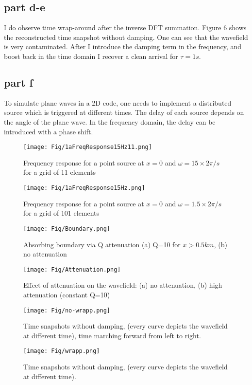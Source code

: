 \documentclass[10pt]{article}
\begin{document}
\subsection{part d-e}
I do observe time wrap-around after the inverse DFT summation. Figure 6 shows the reconstructed time snapshot without damping. One can see that the wavefield is very contaminated. After I introduce the damping term in the frequency, and boost back in the time domain I recover a clean arrival for $\tau=1s$.


\subsection{part f}
To simulate plane waves in a 2D code, one needs to implement a distributed source which is triggered at different times. The delay of each source depends on the angle of the plane wave. In the frequency domain, the delay can be introduced with a phase shift. 

 
\begin{figure}
  \center
  \texttt{[image: Fig/1aFreqResponse15Hz11.png]}
  \caption{Frequency response for a point source at $x=0$ and $\omega=15\times2\pi/s$ for a grid of 11 elements}
\end{figure}

\begin{figure}
  \center
  \texttt{[image: Fig/1aFreqResponse15Hz.png]}
  \caption{Frequency response for a point source at $x=0$ and $\omega=1.5\times2\pi/s$ for a grid of 101 elements}
\end{figure}


\begin{figure}
  \center
  \texttt{[image: Fig/Boundary.png]}
  \caption{Absorbing boundary via Q attenuation (a) Q=10 for $x>0.5km$, (b) no attenuation}
\end{figure}

\begin{figure}
  \center
  \texttt{[image: Fig/Attenuation.png]}
  \caption{Effect of attenuation on the wavefield: (a) no attenuation, (b) high attenuation (constant Q=10)}
\end{figure}



\begin{figure}
  \center
  \texttt{[image: Fig/no-wrapp.png]}
  \caption{Time snapshots without damping, (every curve depicts the wavefield at different time), time marching forward from left to right.}
\end{figure}



\begin{figure}
  \center
  \texttt{[image: Fig/wrapp.png]}
  \caption{Time snapshots without damping, (every curve depicts the wavefield at different time).}
\end{figure}
\end{document}
